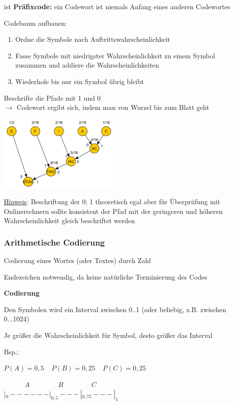 ist \textbf{Präfixcode:} ein Codewort ist niemals Anfang eines anderen Codewortes

Codebaum aufbauen:
\begin{enumerate}
    \item Ordne die Symbole nach Auftrittswahrscheinlichkeit
    \item Fasse Symbole mit niedrigster Wahrscheinlichkeit zu einem Symbol zusammen und addiere die Wahrscheinlichkeiten
    \item Wiederhole bis nur ein Symbol übrig bleibt
\end{enumerate}

Beschrifte die Pfade mit 1 und 0\\
$\rightarrow$ Codewort ergibt sich, indem man von Wurzel bis zum Blatt geht

\includegraphics[width=6cm]{img/huffman.PNG}

\underline{Hinweis}: Beschriftung der 0; 1 theoretisch egal aber für Überprüfung mit Onlinerechnern
sollte konsistent der Pfad mit der geringeren und höheren Wahrscheinlichkeit gleich beschriftet
werden

\subsubsection{Arithmetische Codierung}

Codierung eines Wortes (oder Textes) durch Zahl

Endezeichen notwendig, da keine natürliche Terminierung des Codes

\textbf{Codierung}

Den Symbolen wird ein Interval zwischen 0..1 (oder beliebig, z.B. zwischen 0...1024)

Je größer die Wahrscheinlichkeit für Symbol, desto größer das Interval

Bsp.:

$P(A) = 0,5\;\;\;\; P(B) = 0,25 \;\;\;\; P(C) = 0,25$

$\displaystyle{
    \;\;\;\;\;\;\;\;\;\;\;A
    \;\;\;\;\;\;\;\;\;\;\;\;\;\;\;B
    \;\;\;\;\;\;\;\;\;\;\;\;\;\;\;C
}$\\
$|_{0}------|_{0,5}---|_{0,75}---|_{1}$

